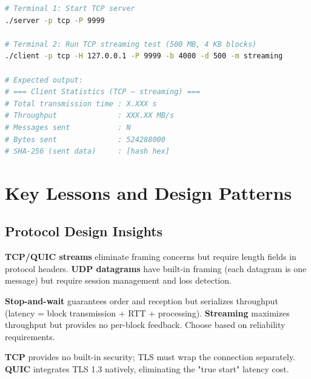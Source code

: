 \documentclass[12pt,a4paper]{article}
\begin{document}
\begin{lstlisting}[caption=Example Test Commands,label=lst:test_cmds,language=bash]
# Terminal 1: Start TCP server
./server -p tcp -P 9999

# Terminal 2: Run TCP streaming test (500 MB, 4 KB blocks)
./client -p tcp -H 127.0.0.1 -P 9999 -b 4000 -d 500 -m streaming

# Expected output:
# === Client Statistics (TCP – streaming) ===
# Total transmission time : X.XXX s
# Throughput              : XXX.XX MB/s
# Messages sent           : N
# Bytes sent              : 524288000
# SHA-256 (sent data)     : [hash hex]
\end{lstlisting}

\section{Key Lessons and Design Patterns}
\label{sec:lessons}

\subsection{Protocol Design Insights}

\begin{tcolorbox}[colback=tcpblue!5,colframe=tcpblue,title=1. Stream vs. Datagram Tradeoffs]
\textbf{TCP/QUIC streams} eliminate framing concerns but require length fields in protocol headers. 
\textbf{UDP datagrams} have built-in framing (each datagram is one message) but require session management 
and loss detection.
\end{tcolorbox}

\begin{tcolorbox}[colback=udporange!5,colframe=udporange,title=2. Acknowledgment Patterns]
\textbf{Stop-and-wait} guarantees order and reception but serializes throughput (latency = block transmission + RTT + processing).
\textbf{Streaming} maximizes throughput but provides no per-block feedback. Choose based on reliability requirements.
\end{tcolorbox}

\begin{tcolorbox}[colback=quicgreen!5,colframe=quicgreen,title=3. Encryption and Security]
\textbf{TCP} provides no built-in security; TLS must wrap the connection separately.
\textbf{QUIC} integrates TLS 1.3 natively, eliminating the "true start" latency cost.
\end{tcolorbox}
\end{document}
